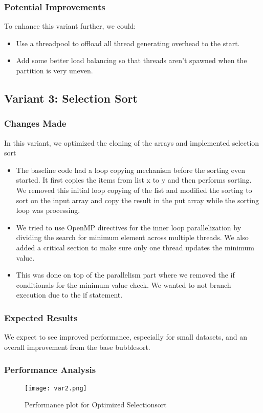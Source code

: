 \documentclass[twocolumn]{article}
\begin{document}
\subsubsection{Potential Improvements}
To enhance this variant further, we could:
\begin{itemize}
    \item Use a threadpool to offload all thread generating overhead to the start.
    \item Add some better load balancing so that threads aren't spawned when the partition is very uneven.
\end{itemize}
\subsection{Variant 3: Selection Sort }

\subsubsection{Changes Made}
In this variant, we optimized the cloning of the arrays and implemented selection sort
\begin{itemize}
    \item The baseline code had a loop copying mechanism before the sorting even started. It first copies the items from list x to y and then performs sorting. We removed this initial loop copying of the list and modified the sorting to sort on the input array and copy the result in the put array while the sorting loop was processing. 
    \item We tried to use OpenMP directives for the inner loop parallelization by dividing the search for minimum element across multiple threads. We also added a critical section to make sure only one thread updates the minimum value.
    \item  This was done on top of the parallelism part where we removed the if conditionals for the minimum value check. We wanted to not branch execution due to the if statement.
\end{itemize}

\subsubsection{Expected Results}
We expect to see improved performance, especially for small datasets, and an overall improvement from the base bubblesort.
\subsubsection{Performance Analysis}
\begin{figure}[H]
    \centering
    \texttt{[image: var2.png]}
    \caption{Performance plot for Optimized Selectionsort}
    \label{fig:variant3_plot}
\end{figure}
\end{document}
